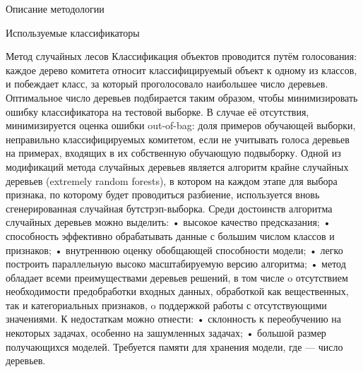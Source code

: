\begin{section}{Описание методологии}
\begin{subsection}{Используемые классификаторы}
\begin{subsubsection}{Метод случайных лесов}
Классификация объектов проводится путём голосования: каждое дерево комитета относит классифицируемый объект к одному из классов, и побеждает класс, за который проголосовало наибольшее число деревьев.
Оптимальное число деревьев подбирается таким образом, чтобы минимизировать ошибку классификатора на тестовой выборке. В случае её отсутствия, минимизируется оценка ошибки out-of-bag: доля примеров обучающей выборки, неправильно классифицируемых комитетом, если не учитывать голоса деревьев на примерах, входящих в их собственную обучающую подвыборку.
Одной из модификаций метода случайных деревьев является алгоритм крайне случайных деревьев (extremely random forests), в котором на каждом этапе для выбора признака, по которому будет проводиться разбиение, используется вновь сгенерированная случайная бутстрэп-выборка.
Среди достоинств алгоритма случайных деревьев можно выделить:
•	высокое качество предсказания;
•	способность эффективно обрабатывать данные с большим числом классов и признаков;
•	внутреннюю оценку обобщающей способности модели;
•	легко построить параллельную высоко масштабируемую версию алгоритма;
•	метод обладает всеми преимуществами деревьев решений, в том числе
o	отсутствием необходимости предобработки входных данных, обработкой как вещественных, так и категориальных признаков,
o	поддержкой работы с отсутствующими значениями.
К недостаткам можно отнести:
•	склонность к переобучению на некоторых задачах, особенно на зашумленных задачах;
•	большой размер получающихся моделей. Требуется  памяти для хранения модели, где  — число деревьев.

    \end{subsubsection}

  \end{subsection}

\end{section}
